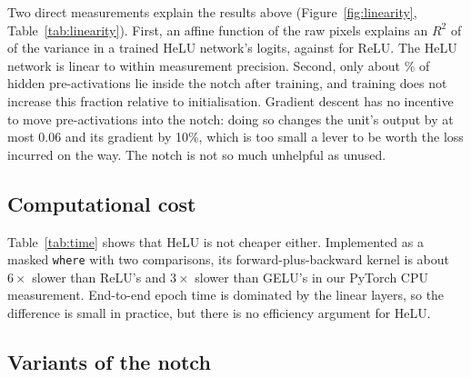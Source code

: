 \documentclass[11pt]{article}
\begin{document}
Two direct measurements explain the results above (Figure~\ref{fig:linearity}, Table~\ref{tab:linearity}).
First, an affine function of the raw pixels explains an $R^2$ of \rTwoHelu{} of the variance in a
trained HeLU network's logits, against \rTwoRelu{} for ReLU. The HeLU network is linear to within
measurement precision. Second, only about \notchHelu\% of hidden pre-activations lie inside the notch
after training, and training does not increase this fraction relative to initialisation. Gradient
descent has no incentive to move pre-activations into the notch: doing so changes the unit's output by
at most $0.06$ and its gradient by 10\%, which is too small a lever to be worth the loss incurred on the
way. The notch is not so much unhelpful as unused.

\subsection{Computational cost}

\begin{table}[t]
  \centering\small
  \caption{Cost. Rows 1--3: median wall-clock seconds per training epoch over seeds (4 CPU threads on
  a shared machine; the median is used because a few runs overlapped with other jobs). Last row:
  forward plus backward time of the activation kernel alone, measured on an otherwise idle machine.}
  \label{tab:time}
  
\end{table}

Table~\ref{tab:time} shows that HeLU is not cheaper either. Implemented as a masked \texttt{where}
with two comparisons, its forward-plus-backward kernel is about $6\times$ slower than ReLU's and
$3\times$ slower than GELU's in our PyTorch CPU measurement. End-to-end epoch time is dominated by the
linear layers, so the difference is small in practice, but there is no efficiency argument for HeLU.

\subsection{Variants of the notch}
\label{sec:variants}
\end{document}
